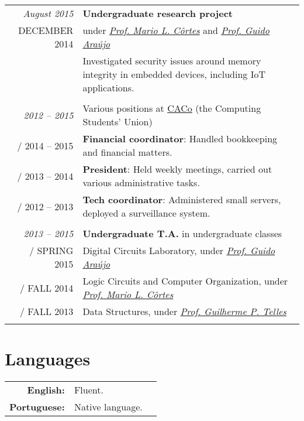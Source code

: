 \documentclass[a4paper,10pt]{article}
\makeatletter
\def\fakesc#1{%
  \begingroup%
  \xdef\fake@name{\csname\curr@fontshape/\f@size\endcsname}%
  \fontsize{\fontdimen8\fake@name}{\baselineskip}\selectfont%
  \uppercase{#1}%
  \endgroup%
}
\renewcommand{\textsc}{\fakesc}
\makeatother
\begin{document}
\begin{tabular}{r|p{11cm}}

    \emph{August 2015} & \textbf{Undergraduate research project}\\
  \textsc{December 2014} & under \href{http://www.ic.unicamp.br/~cortes/}{\emph{Prof. Mario L. Côrtes}} and \href{http://guidoaraujo.wordpress.com/}{\emph{Prof. Guido Araújo}}\\
                 & \footnotesize {Investigated security issues around memory integrity in embedded devices, including IoT applications.}\\
  \multicolumn{2}{c}{} \\

  \emph{2012 -- 2015} & Various positions at \href{http://www.caco.ic.unicamp.br}{CACo} (the Computing Students' Union) \\
  \textsc{2014 -- 2015} & \footnotesize{\textbf{Financial coordinator}: Handled bookkeeping and financial matters.}\\
  \textsc{2013 -- 2014} & \footnotesize{\textbf{President}: Held weekly meetings, carried out various administrative tasks.}\\
  \textsc{2012 -- 2013} & \footnotesize{\textbf{Tech coordinator}: Administered small servers, deployed a surveillance system.}\\
  \multicolumn{2}{c}{} \\

  \emph{2013 -- 2015} & \textbf{Undergraduate T.A.} in undergraduate classes \\
  \textsc{Spring 2015} & \footnotesize{Digital Circuits Laboratory, under \href{http://guidoaraujo.wordpress.com/}{\emph{Prof. Guido Araújo}}}\\
  \textsc{Fall 2014} & \footnotesize{Logic Circuits and Computer Organization, under \href{http://www.ic.unicamp.br/~cortes/}{\emph{Prof. Mario L. Côrtes}}}\\
  \textsc{Fall 2013} & \footnotesize{Data Structures, under \href{http://ic.unicamp.br/~gpt/}{\emph{Prof. Guilherme P. Telles}}}\\
  \multicolumn{2}{c}{}\\

\end{tabular}

 \section{Languages}

 \begin{tabularx}{\textwidth}{rXr}
   \textbf{English:} & Fluent. \\
   \textbf{Portuguese:} & Native language.\\
 \end{tabularx}
\end{document}
